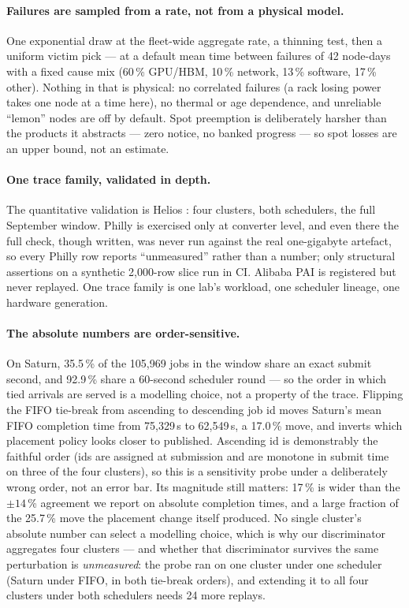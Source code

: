 \paragraph{Failures are sampled from a rate, not from a physical model.}
One exponential draw at the fleet-wide aggregate rate, a thinning test, then a
uniform victim pick --- at a default mean time between failures of 42 node-days
with a fixed cause mix (60\,\% GPU/HBM, 10\,\% network, 13\,\% software, 17\,\%
other). Nothing in that is physical: no correlated failures (a rack losing power
takes one node at a time here), no thermal or age dependence, and unreliable
``lemon'' nodes are off by default. Spot preemption is deliberately harsher than
the products it abstracts --- zero notice, no banked progress --- so spot losses
are an upper bound, not an estimate.

\paragraph{One trace family, validated in depth.}
The quantitative validation is Helios \cite{helios2021}: four clusters, both
schedulers, the full September window. Philly \cite{philly2019} is exercised only
at converter level, and even there the full check, though written, was never run
against the real one-gigabyte artefact, so every Philly row reports
``unmeasured'' rather than a number; only structural assertions on a synthetic
2{,}000-row slice run in CI. Alibaba PAI is registered but never replayed. One
trace family is one lab's workload, one scheduler lineage, one hardware
generation.

\paragraph{The absolute numbers are order-sensitive.}
On Saturn, 35.5\,\% of the 105{,}969 jobs in the window share an exact submit
second, and 92.9\,\% share a 60-second scheduler round --- so the order in which
tied arrivals are served is a modelling choice, not a property of the trace.
Flipping the FIFO tie-break from ascending to descending job id moves Saturn's
mean FIFO completion time from 75{,}329\,s to 62{,}549\,s, a 17.0\,\% move, and
inverts which placement policy looks closer to published. Ascending id is
demonstrably the faithful order (ids are assigned at submission and are monotone
in submit time on three of the four clusters), so this is a sensitivity probe
under a deliberately wrong order, not an error bar. Its magnitude still matters:
17\,\% is wider than the $\pm 14$\,\% agreement we report on absolute completion
times, and a large fraction of the 25.7\,\% move the placement change itself
produced. No single cluster's absolute number can select a modelling choice,
which is why our discriminator aggregates four clusters --- and whether that
discriminator survives the same perturbation is \emph{unmeasured}: the probe ran
on one cluster under one scheduler (Saturn under FIFO, in both tie-break
orders), and extending it to all four clusters under both schedulers needs 24
more replays.

